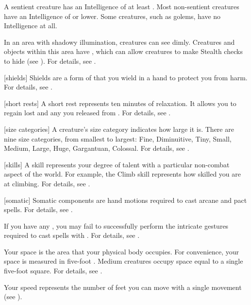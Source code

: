  A sentient creature has an Intelligence of at least .
Most non-sentient creatures have an Intelligence of  or lower.
Some creatures, such as golems, have no Intelligence at all.

 In an area with shadowy illumination, creatures can see dimly.
Creatures and objects within this area have , which can allow creatures to make Stealth checks to hide (see ).
For details, see .

[shields] Shields are a form of  that you wield in a hand to protect you from harm.
For details, see .

[short rests] A short rest represents ten minutes of relaxation.
It allows you to regain lost  and any  you released from .
For details, see .

[size categories] A creature's size category indicates how large it is.
There are nine size categories, from smallest to largest: Fine, Diminuitive, Tiny, Small, Medium, Large, Huge, Gargantuan, Colossal.
For details, see .

[skills] A skill represents your degree of talent with a particular non-combat aspect of the world.
For example, the Climb skill represents how skilled you are at climbing.
For details, see .

[somatic] Somatic components are hand motions required to cast arcane and pact spells.
For details, see .

 If you have any , you may fail to successfully perform the intricate gestures required to cast spells with .
For details, see .

 Your space is the area that your physical body occupies.
For convenience, your space is measured in five-foot .
Medium creatures occupy space equal to a single five-foot square.
For details, see .

 Your speed represents the number of feet you can move with a single movement (see ).

